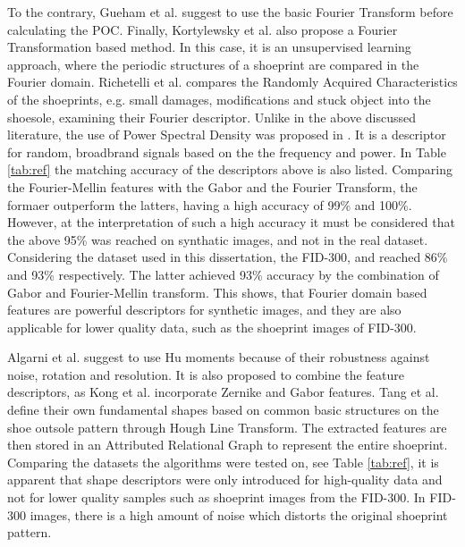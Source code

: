 \documentclass[draft,final]{vutinfth} %
\begin{document}
To the contrary, Gueham et al. \cite{gueham2007automatic} suggest to use the basic Fourier Transform before calculating the POC.
Finally, Kortylewsky et al. \cite{kortylewski2014unsupervised} also propose a Fourier Transformation based method.
In this case, it is an unsupervised learning approach, where the periodic structures of a shoeprint are compared in the Fourier domain.
Richetelli et al. \cite{richetelli2017quantitative} compares the Randomly Acquired Characteristics of the shoeprints, e.g. small damages, modifications and stuck object into the shoesole, examining their Fourier descriptor.
Unlike in the above discussed literature, the use of Power Spectral Density was proposed in \cite{dardi2009texture}.
It is a descriptor for random, broadbrand signals based on the the frequency and power.
In Table \ref{tab:ref} the matching accuracy of the descriptors above is also listed.
Comparing the Fourier-Mellin features with the Gabor and the Fourier Transform, the formaer outperform the latters, having a high accuracy of 99\% and 100\%.
However, at the interpretation of such a high accuracy it must be considered that the above 95\% was reached on synthatic images, and not in the real dataset.
Considering the dataset used in this dissertation, the FID-300, \cite{kortylewski2014unsupervised} and \cite{wu2019crime} reached 86\% and 93\% respectively.
The latter achieved 93\% accuracy by the combination of Gabor and Fourier-Mellin transform.
This shows, that Fourier domain based features are powerful descriptors for synthetic images, and they are also applicable for lower quality data, such as the shoeprint images of FID-300.
\par
Algarni et al. \cite{algarni2008novel} suggest to use Hu moments because of their robustness against noise, rotation and resolution.
It is also proposed to combine the feature descriptors, as Kong et al. \cite{kong2014novel} incorporate Zernike and Gabor features.
Tang et al. \cite{tang2010footwear} define their own fundamental shapes based on common basic structures on the shoe outsole pattern through Hough Line Transform. 
The extracted features are then stored in an Attributed Relational Graph to represent the entire shoeprint.
Comparing the datasets the algorithms were tested on, see Table \ref{tab:ref}, it is apparent that shape descriptors were only introduced for high-quality data and not for lower quality samples such as shoeprint images from the FID-300.
In FID-300 images, there is a high amount of noise which distorts the original shoeprint pattern.
\end{document}
